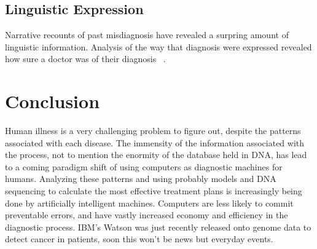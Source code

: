 \documentclass[11pt]{article}
\newcommand{\tab}{\hspace*{2em}}
\begin{document}
\begin{doublespace}
\subsection{Linguistic Expression}

\tab Narrative recounts of past misdiagnosis have revealed a surpring amount of linguistic information. Analysis of the 
way that diagnosis were expressed revealed how sure a doctor was of their diagnosis ~\cite{McCoy:2012:LUP:2392701.2392704}. 

\section{Conclusion}

\tab Human illness is a very challenging problem to figure out, despite the patterns associated with each disease. The
immensity of the information associated with the process, not to mention the enormity of the database held in DNA, has 
lead to a coming paradigm shift of using computers as diagnostic machines for humans. Analyzing these patterns and using
probably models and DNA sequencing to calculate the most effective treatment plans is increasingly being done by 
artificially intelligent machines. Computers are less likely to commit preventable errors, and have vastly increased 
economy and efficiency in the diagnostic process. IBM's Watson was just recently released onto genome data to detect 
cancer in patients, soon this won't be news but everyday events. 

\pagebreak


\end{doublespace}

\nocite{*}



\end{document}
